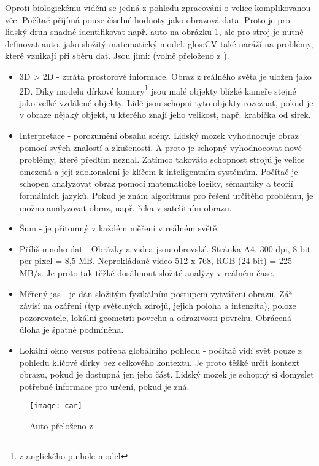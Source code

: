 Oproti biologickému vidění se jedná z pohledu zpracování o velice komplikovanou věc. Počítač přijímá pouze číselné hodnoty jako obrazová data. Proto je pro lidský druh snadné identifikovat např. auto na obrázku \ref{fig:car}, ale pro stroj je nutné definovat auto, jako složitý matematický model. \gls{glos:CV} také naráží na problémy, které vznikají při sběru dat. Jsou jimi: (volně přeloženo z \cite{image}).
\begin{itemize}
	\item 3D > 2D - ztráta prostorové informace. Obraz z reálného světa je uložen jako 2D. Díky modelu dírkové komory\footnote{z anglického pinhole model} jsou malé objekty blízké kameře stejné jako velké vzdálené objekty. Lidé jsou schopni tyto objekty rozeznat, pokud je v obraze nějaký objekt, u kterého znají jeho velikost, např. krabička od sirek.
	\item Interpretace - porozumění obsahu scény. Lidský mozek vyhodnocuje obraz pomocí svých znalostí a zkušeností. A proto je schopný vyhodnocovat nové problémy, které předtím neznal. Zatímco takováto schopnost strojů je velice omezená a její zdokonalení je klíčem k inteligentním systémům. Počítač je schopen analyzovat obraz pomocí matematické logiky, sémantiky a teorií formálních jazyků. Pokud je znám algoritmus pro řešení určitého problému, je možno analyzovat obraz, např. řeka v satelitním obrazu.
	\item Šum - je přítomný v každém měření v reálném světě.
	\item Příliš mnoho dat - Obrázky a videa jsou obrovské. Stránka A4, 300 dpi, 8 bit per pixel = 8,5 MB. Neprokládané video 512 x 768, RGB (24 bit) = 225 MB/s. Je proto tak těžké dosáhnout složité analýzy v reálném čase.
	\item Měřený jas - je dán složitým fyzikálním postupem vytváření obrazu. Zář závisí na ozáření (typ světelných zdrojů, jejich poloha a intenzita),
	poloze pozorovatele, lokální geometrii povrchu a odrazivosti povrchu.
	Obrácená úloha je špatně podmíněna.
	\item Lokální okno versus potřeba globálního pohledu - počítač vidí svět pouze z pohledu klíčové dírky bez celkového kontextu. Je proto těžké určit kontext obrazu, pokud je dostupná jen jeho část. Lidský mozek je schopný si domyslet potřebné informace pro určení, pokud je zná.
\end{itemize}

\begin{figure}[h]
	\texttt{[image: car]}
	\centering
	\caption{Auto přeloženo z\cite{learning}\label{fig:car}}
\end{figure} 


